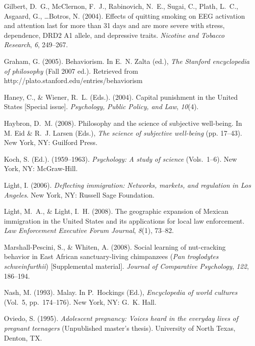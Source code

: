 \documentclass[]{interact}
\theoremstyle{plain}%
\theoremstyle{definition}
\theoremstyle{remark}
\begin{document}
\begin{thebibliography}{}
Gilbert, D.~G., McClernon, F.~J., Rabinovich, N.~E., Sugai, C., Plath, L.~C.,
 Asgaard, G., \ldots Botros, N. (2004). Effects of quitting smoking on EEG
 activation and attention last for more than 31 days and are more severe with
 stress, dependence, DRD2 A1 allele, and depressive traits. \emph{Nicotine
 and Tobacco Research}, \emph{6}, 249--267.

Graham, G. (2005). Behaviorism. In E.~N. Zalta (ed.), \emph{The Stanford
 encyclopedia of philosophy} (Fall 2007 ed.). Retrieved from
 http://plato.stanford.edu/entries/behaviorism

Haney, C., \& Wiener, R.~L. (Eds.). (2004). Capital punishment in the United
 States [Special issue]. \emph{Psychology, Public Policy, and Law},
 \emph{10}(4).

Haybron, D.~M. (2008). Philosophy and the science of subjective well-being. In
 M. Eid \& R.~J. Larsen (Eds.), \emph{The science of subjective well-being}
 (pp. 17--43). New York, NY: Guilford Press.

Koch, S. (Ed.). (1959--1963). \emph{Psychology: A study of science}
 (Vols.~1--6). New York, NY: McGraw-Hill.

Light, I. (2006). \emph{Deflecting immigration: Networks, markets, and
 regulation in Los Angeles}. New York, NY: Russell Sage Foundation.

Light, M.~A., \& Light, I.~H. (2008). The geographic expansion of Mexican
 immigration in the United States and its applications for local law
 enforcement. \emph{Law Enforcement Executive Forum Journal}, \emph{8}(1),
 73--82.

Marshall-Pescini, S., \& Whiten, A. (2008). Social learning of nut-cracking
 behavior in East African sanctuary-living chimpanzees (\emph{Pan troglodytes
 schweinfurthii}) [Supplemental material]. \emph{Journal of Comparative
 Psychology}, \emph{122}, 186--194.

Nash, M. (1993). Malay. In P.~Hockings (Ed.), \emph{Encyclopedia of world
 cultures} (Vol.~5, pp.~174--176). New York, NY: G.~K. Hall.

Oviedo, S. (1995). \emph{Adolescent pregnancy: Voices heard in the everyday
 lives of pregnant teenagers} (Unpublished master's thesis). University of
 North Texas, Denton, TX.


\end{thebibliography}
\end{document}
